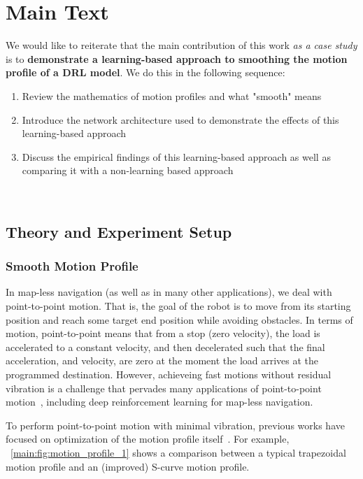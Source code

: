 
\chapter{Main Text}
\label{ch:main}
\vspace{2em}

We would like to reiterate that the main contribution of this work \textit{as a case study} is to \textbf{demonstrate a learning-based approach to smoothing the motion profile of a DRL model}. We do this in the following sequence:
\begin{enumerate}
\item Review the mathematics of motion profiles and what "smooth" means
\item Introduce the network architecture used to demonstrate the effects of this learning-based approach
\item Discuss the empirical findings of this learning-based approach as well as comparing it with a non-learning based approach
\end{enumerate}

~\cite{lewin_mathematics_nodate}

\section{Theory and Experiment Setup}
\subsection{Smooth Motion Profile}
In map-less navigation (as well as in many other applications), we deal with point-to-point motion. That is, the goal of the robot is to move from its starting position and reach some target end position while avoiding obstacles. In terms of motion, point-to-point means that from a stop (zero velocity), the load is accelerated to a constant velocity, and then decelerated such that the final acceleration, and velocity, are zero at the moment the load arrives at the programmed destination. However, achieveing fast motions without residual vibration is a challenge that pervades many applications of point-to-point motion~\cite{meckl_optimized_1998}, including deep reinforcement learning for map-less navigation.

To perform point-to-point motion with minimal vibration, previous works have focused on optimization of the motion profile itself~\cite{meckl_optimized_1998}. For example, ~\autoref{main:fig:motion_profile_1} shows a comparison between a typical trapezoidal motion profile and an (improved) S-curve motion profile. 

